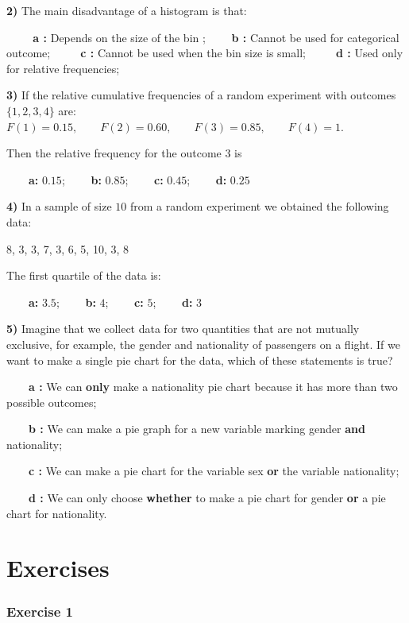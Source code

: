 \documentclass[
]{book}
\begin{document}
\textbf{2)} The main disadvantage of a histogram is that:

\textbf{\(\qquad\) a :} Depends on the size of the bin ; \textbf{\(\qquad\)b :} Cannot be used for categorical outcome;
\textbf{\(\qquad\) c :} Cannot be used when the bin size is small;
\textbf{\(\qquad\) d :} Used only for relative frequencies;

\textbf{3)} If the relative cumulative frequencies of a random experiment with outcomes \(\{1,2,3,4\}\) are: \(F(1)=0.15, \qquad F(2)=0.60, \qquad F(3)=0.85, \qquad F(4)=1\).

Then the relative frequency for the outcome \(3\) is

\textbf{\(\qquad\)a:} \(0.15\); \textbf{\(\qquad\)b:} \(0.85\); \textbf{\(\qquad\)c:} \(0.45\); \textbf{\(\qquad\)d:} \(0.25\)

\textbf{4)} In a sample of size \(10\) from a random experiment we obtained the following data:

8, 3, 3, 7, 3, 6, 5, 10, 3, 8

The first quartile of the data is:

\textbf{\(\qquad\)a:} \(3.5\); \textbf{\(\qquad\)b:} \(4\); \textbf{\(\qquad\)c:} \(5\); \textbf{\(\qquad\)d:} \(3\)

\textbf{5)} Imagine that we collect data for two quantities that are not mutually exclusive, for example, the gender and nationality of passengers on a flight. If we want to make a single pie chart for the data, which of these statements is true?

\textbf{\(\qquad\)a :} We can \textbf{only} make a nationality pie chart because it has more than two possible outcomes;

\textbf{\(\qquad\)b :} We can make a pie graph for a new variable marking gender \textbf{and} nationality;

\textbf{\(\qquad\)c :} We can make a pie chart for the variable sex \textbf{or} the variable nationality;

\textbf{\(\qquad\)d :} We can only choose \textbf{whether} to make a pie chart for gender \textbf{or} a pie chart for nationality.

\hypertarget{exercises}{%
\section{Exercises}\label{exercises}}

\hypertarget{exercise-1}{%
\subsubsection{Exercise 1}\label{exercise-1}}
\end{document}
